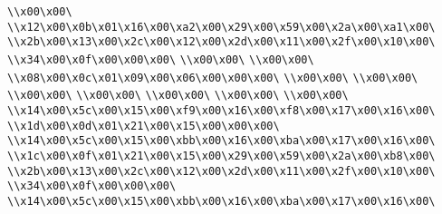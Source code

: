 \verb|\\x00\x00\|\newline
\verb|\\x12\x00\x0b\x01\x16\x00\xa2\x00\x29\x00\x59\x00\x2a\x00\xa1\x00\|\newline
\verb|\\x2b\x00\x13\x00\x2c\x00\x12\x00\x2d\x00\x11\x00\x2f\x00\x10\x00\|\newline
\verb|\\x34\x00\x0f\x00\x00\x00\|\newline
\verb|\\x00\x00\|\newline
\verb|\\x00\x00\|\newline
\verb|\\x08\x00\x0c\x01\x09\x00\x06\x00\x00\x00\|\newline
\verb|\\x00\x00\|\newline
\verb|\\x00\x00\|\newline
\verb|\\x00\x00\|\newline
\verb|\\x00\x00\|\newline
\verb|\\x00\x00\|\newline
\verb|\\x00\x00\|\newline
\verb|\\x00\x00\|\newline
\verb|\\x14\x00\x5c\x00\x15\x00\xf9\x00\x16\x00\xf8\x00\x17\x00\x16\x00\|\newline
\verb|\\x1d\x00\x0d\x01\x21\x00\x15\x00\x00\x00\|\newline
\verb|\\x14\x00\x5c\x00\x15\x00\xbb\x00\x16\x00\xba\x00\x17\x00\x16\x00\|\newline
\verb|\\x1c\x00\x0f\x01\x21\x00\x15\x00\x29\x00\x59\x00\x2a\x00\xb8\x00\|\newline
\verb|\\x2b\x00\x13\x00\x2c\x00\x12\x00\x2d\x00\x11\x00\x2f\x00\x10\x00\|\newline
\verb|\\x34\x00\x0f\x00\x00\x00\|\newline
\verb|\\x14\x00\x5c\x00\x15\x00\xbb\x00\x16\x00\xba\x00\x17\x00\x16\x00\|\newline
